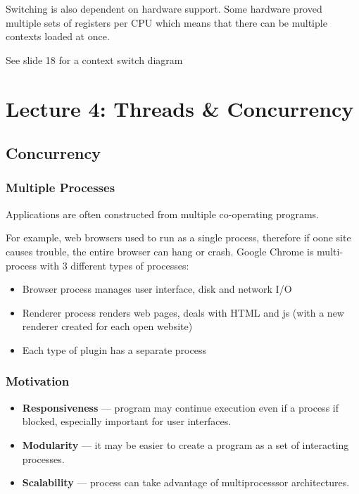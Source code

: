 \documentclass{article}%
\begin{document}
Switching is also dependent on hardware support.
Some hardware proved multiple sets of registers per CPU which means that there can be multiple contexts loaded at once.

See slide 18 for a context switch diagram

\maketitle
\section{Lecture 4: Threads \& Concurrency}
\newpage

\subsection{Concurrency}
\subsubsection{Multiple Processes}
Applications are often constructed from multiple co-operating programs.

For example, web browsers used to run as a single process, therefore if oone site causes trouble, the entire browser can hang or crash.
Google Chrome is multi-process with 3 different types of processes:
\begin{itemize}
	\item Browser process manages user interface, disk and network I/O
	\item Renderer process renders web pages, deals with HTML and js (with a new renderer created for each open website)
	\item Each type of plugin has a separate process
\end{itemize}

\subsubsection{Motivation}
\begin{itemize}
	\item \textbf{Responsiveness} --- program may continue execution even if a process if blocked, especially important for user interfaces.
	\item \textbf{Modularity} --- it may be easier to create a program as a set of interacting processes. 
	\item \textbf{Scalability} --- process can take advantage of multiprocesssor architectures.
\end{itemize}
\end{document}
